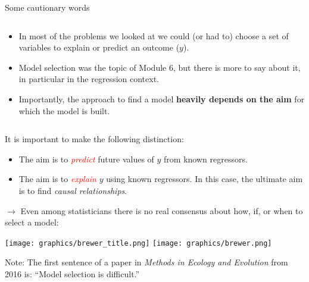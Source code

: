 \documentclass[10pt,ignorenonframetext,]{beamer}
\providecommand{\tightlist}{%
  \setlength{\itemsep}{0pt}\setlength{\parskip}{0pt}}
\begin{document}
\begin{frame}{Some cautionary words}
\protect\hypertarget{some-cautionary-words}{}

\(~\)

\begin{itemize}
\item
  In most of the problems we looked at we could (or had to) choose a set
  of variables to explain or predict an outcome (\(y\)).
\item
  Model selection was the topic of Module 6, but there is more to say
  about it, in particular in the regression context.
\item
  Importantly, the approach to find a model \textbf{heavily depends on
  the aim} for which the model is built.
\end{itemize}

\(~\)

It is important to make the following distinction:

\begin{itemize}
\tightlist
\item
  The aim is to \emph{\textcolor{red}{predict}} future values of \(y\)
  from known regressors.
\item
  The aim is to \emph{\textcolor{red}{explain}} \(y\) using known
  regressors. In this case, the ultimate aim is to find \emph{causal
  relationships}.
\end{itemize}

\end{frame}

\begin{frame}

\(\rightarrow\) Even among statisticians there is no real consensus
about how, if, or when to select a model:

\vspace{2mm}

\texttt{[image: graphics/brewer\_title.png]}
\texttt{[image: graphics/brewer.png]}

Note: The first sentence of a paper in \emph{Methods in Ecology and
Evolution} from 2016 is: ``Model selection is difficult.''

\end{frame}
\end{document}
